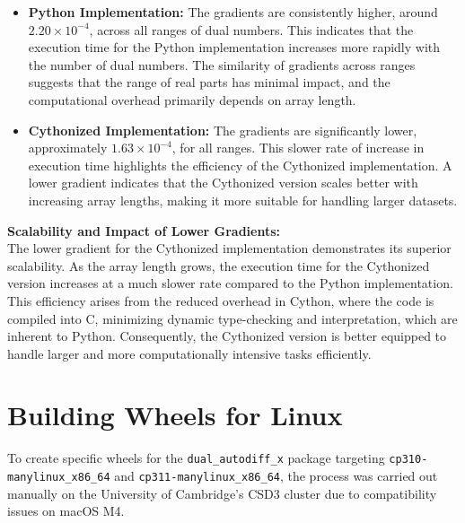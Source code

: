 \documentclass[a4paper,12pt]{article}
\begin{document}
\begin{itemize}
    \item \textbf{Python Implementation:} The gradients are consistently higher, around \(2.20 \times 10^{-4}\), across all ranges of dual numbers. This indicates that the execution time for the Python implementation increases more rapidly with the number of dual numbers. The similarity of gradients across ranges suggests that the range of real parts has minimal impact, and the computational overhead primarily depends on array length.
    
    \item \textbf{Cythonized Implementation:} The gradients are significantly lower, approximately \(1.63 \times 10^{-4}\), for all ranges. This slower rate of increase in execution time highlights the efficiency of the Cythonized implementation. A lower gradient indicates that the Cythonized version scales better with increasing array lengths, making it more suitable for handling larger datasets.
\end{itemize}

\textbf{Scalability and Impact of Lower Gradients:} \\
The lower gradient for the Cythonized implementation demonstrates its superior scalability. As the array length grows, the execution time for the Cythonized version increases at a much slower rate compared to the Python implementation. This efficiency arises from the reduced overhead in Cython, where the code is compiled into C, minimizing dynamic type-checking and interpretation, which are inherent to Python. Consequently, the Cythonized version is better equipped to handle larger and more computationally intensive tasks efficiently.

\section{Building Wheels for Linux}

To create specific wheels for the \texttt{dual\_autodiff\_x} package targeting \texttt{cp310-manylinux\_x86\_64} and \texttt{cp311-manylinux\_x86\_64}, the process was carried out manually on the University of Cambridge's CSD3 cluster due to compatibility issues on macOS M4.
\end{document}
